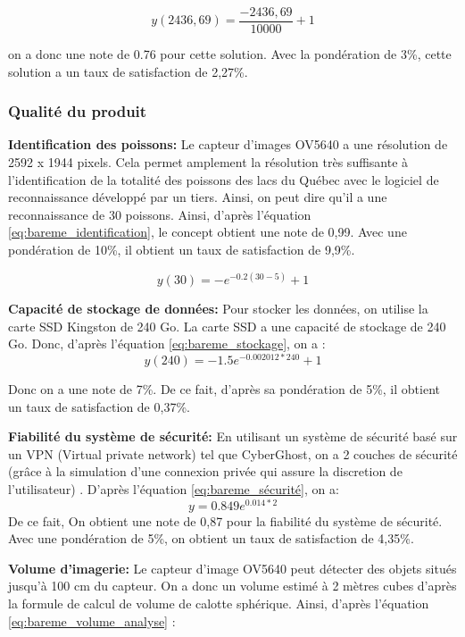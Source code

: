 \begin{equation}
y(2436,69) =  \frac{-2436,69}{10000} +1 \end{equation}

on a donc une note de 0.76 pour cette solution. Avec la pondération de 3\%, cette solution a un taux de satisfaction de 2,27\%.

\subsubsection{Qualité du produit}
\textbf{Identification des poissons:}
Le capteur d'images OV5640 a une résolution de 2592 x 1944 pixels. Cela permet amplement la résolution très suffisante à l'identification de la totalité des poissons des lacs du Québec avec le logiciel de reconnaissance développé par un tiers. Ainsi, on peut dire qu'il a une reconnaissance de 30 poissons. Ainsi, d'après l'équation \ref{eq:bareme_identification}, le concept obtient une note de 0,99. Avec une pondération de 10\%, il obtient un taux de satisfaction de 9,9\%.

\begin{equation}
    y(30) = -e^{-0.2(30-5)} + 1  \end{equation}

\textbf{Capacité de stockage de données:}
Pour stocker les données, on utilise la carte SSD Kingston de 240 Go. La carte SSD a une capacité de stockage de 240 Go. Donc, d'après l'équation \ref{eq:bareme_stockage}, on a :
\begin{equation}
    y(240) = -1.5e^{-0.002012*240} + 1
\end{equation}

Donc on a une note de 7\%. De ce fait, d'après sa pondération de 5\%, il obtient un taux de satisfaction de 0,37\%.


\textbf{Fiabilité du système de sécurité:}
En utilisant un système de sécurité basé sur un VPN (Virtual private network) tel que CyberGhost, on a 2 couches de sécurité (grâce à la simulation d’une connexion privée qui assure la discretion de l'utilisateur) . D'après l'équation \ref{eq:bareme_sécurité}, on a:
\begin{equation}
    y = 0.849 e^{0.014*2}
\end{equation}
De ce fait, On obtient une note de 0,87 pour la fiabilité du système de sécurité. Avec une pondération de 5\%, on obtient un taux de satisfaction de 4,35\%.

\textbf{Volume d'imagerie:}
Le capteur d'image OV5640 peut détecter des objets situés jusqu'à 100 cm du capteur. On a donc un volume estimé à 2 mètres cubes d'après la formule de calcul de volume de calotte sphérique. Ainsi, d'après l'équation \ref{eq:bareme_volume_analyse} :

